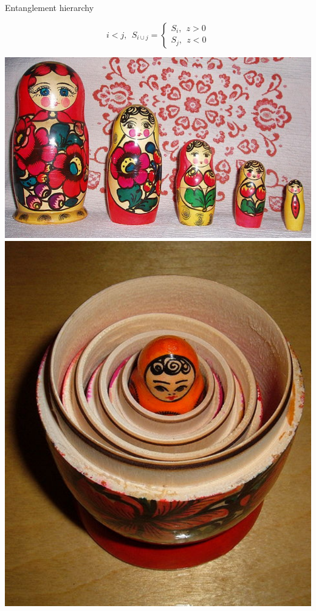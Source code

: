 \documentclass[12pt,aspectratio=169]{beamer}
\begin{document}
\begin{frame}{Entanglement hierarchy}
\begin{minipage}{0.5\textwidth}
\[i < j, ~ ~ S_{i\cup j} =
	\begin{cases}
	S_{i}, ~ ~ z > 0\\
	S_{j}, ~ ~ z < 0
	\end{cases}
\]
\end{minipage}
\begin{minipage}{0.45\textwidth}
\includegraphics[height=0.3\textheight]{figures/Matroshka.png}
\includegraphics[height=0.3\textheight]{figures/nested.png}
\end{minipage}


\end{frame}
\end{document}
